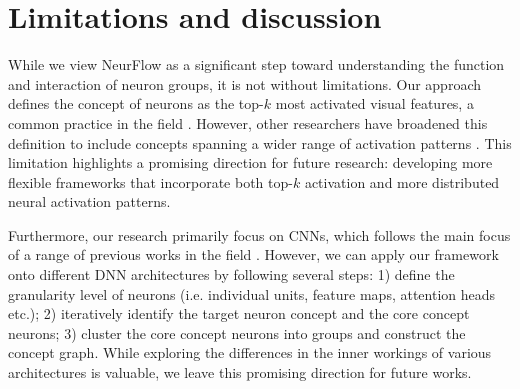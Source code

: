 \section{{Limitations and discussion}}
{While we view NeurFlow as a significant step toward understanding the function and interaction of neuron groups, it is not without limitations. Our approach defines the concept of neurons as the top-$k$ most activated visual features, a common practice in the field \citep{Polysemantic, mu2020compositional, Multifaceted}. However, other researchers have broadened this definition to include concepts spanning a wider range of activation patterns \citep{explaining_neuron, linear_explanation_neuron}. This limitation highlights a promising direction for future research: developing more flexible frameworks that incorporate both top-$k$ activation and more distributed neural activation patterns.}


{Furthermore, our research primarily focus on CNNs, which follows the main focus of a range of previous works in the field \citep{Olah, Polysemantic, Multifaceted, mu2020compositional}. However, we can apply our framework onto different DNN architectures by following several steps: 1) define the granularity level of neurons (i.e. individual units, feature maps, attention heads etc.); 2) iteratively identify the target neuron concept and the core concept neurons; 3) cluster the core concept neurons into groups and construct the concept graph. While exploring the differences in the inner workings of various architectures is valuable, we leave this promising direction for future works.}



